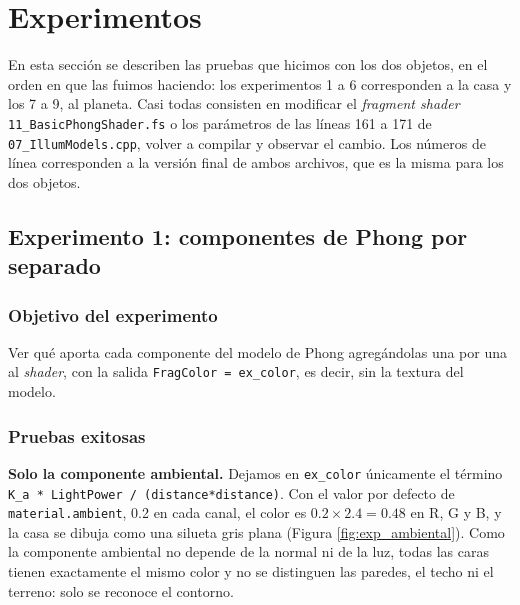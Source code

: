 
\section{Experimentos}

En esta sección se describen las pruebas que hicimos con los dos objetos, en el orden en que las fuimos haciendo: los experimentos 1 a 6 corresponden a la casa y los 7 a 9, al planeta. Casi todas consisten en modificar el \textit{fragment shader} \texttt{11\_BasicPhongShader.fs} o los parámetros de las líneas 161 a 171 de \texttt{07\_IllumModels.cpp}, volver a compilar y observar el cambio. Los números de línea corresponden a la versión final de ambos archivos, que es la misma para los dos objetos.

\subsection{Experimento 1: componentes de Phong por separado}

\subsubsection{Objetivo del experimento}
Ver qué aporta cada componente del modelo de Phong agregándolas una por una al \textit{shader}, con la salida \texttt{FragColor = ex\_color}, es decir, sin la textura del modelo.

\subsubsection{Pruebas exitosas}
\textbf{Solo la componente ambiental.} Dejamos en \texttt{ex\_color} únicamente el término \texttt{K\_a * LightPower / (distance*distance)}. Con el valor por defecto de \texttt{material.ambient}, 0.2 en cada canal, el color es $0.2 \times 2.4 = 0.48$ en R, G y B, y la casa se dibuja como una silueta gris plana (Figura \ref{fig:exp_ambiental}). Como la componente ambiental no depende de la normal ni de la luz, todas las caras tienen exactamente el mismo color y no se distinguen las paredes, el techo ni el terreno: solo se reconoce el contorno.

